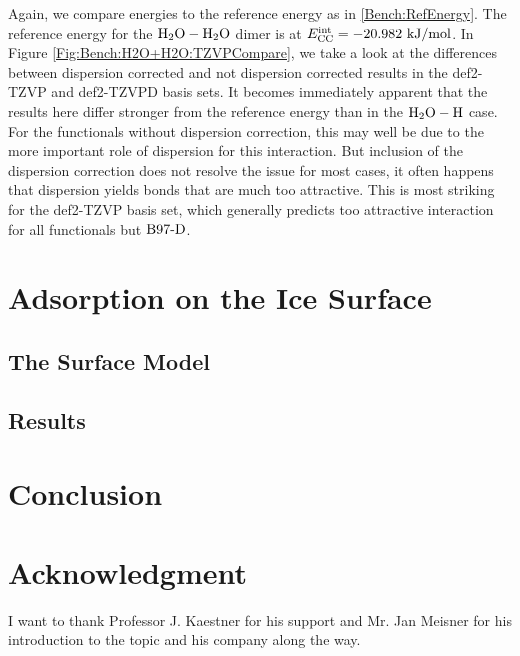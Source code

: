 \documentclass[8.5pt,twoside,twocolumn]{article}
\newcommand\kmo{\enmat{\te {kJ/mol}}}
\theoremstyle{standard}
\begin{document}
Again, we compare energies to the reference energy as in \eqref{Bench:RefEnergy}. The
reference energy for the $\text H _2 \text O-\text H _2 \text O$ dimer is at \mbox{$\ecc=-20.982\ \kmo$}.
In Figure \ref{Fig:Bench:H2O+H2O:TZVPCompare}, we take a look at the differences between
dispersion corrected and not dispersion corrected results in the def2-TZVP and def2-TZVPD
basis sets. It becomes immediately apparent that the results here differ stronger from
the reference energy than in the $\text H _2 \text O-\text H$ case. For the functionals without dispersion
correction, this may well be due to the more important role of dispersion for this interaction. 
But inclusion of the dispersion correction does not resolve the issue for most cases,
it often happens that dispersion yields bonds that are much too attractive. This
is most striking for the def2-TZVP basis set, which generally predicts too attractive
interaction for all functionals but $\text{B97-D}$.

 
\newpage

\section{Adsorption on the Ice Surface}
\label{Sec:Ads}

\subsection{The Surface Model}
\label{Sec:Ads:Model}

\subsection{Results}
\label{Sec:Ads:Results}

\section{Conclusion}
\label{Sec:Con}

\section*{Acknowledgment}
I want to thank Professor J. Kaestner for his support and Mr. Jan Meisner for
his introduction to the topic and his company along the way.


% 


\end{document}
